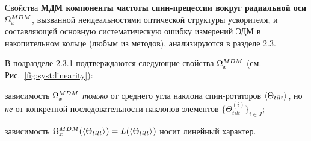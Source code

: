 Свойства \textbf{МДМ компоненты частоты спин-прецессии вокруг радиальной оси} $\Omega_x^{MDM}$, вызванной 
неидеальностями оптической структуры ускорителя, и составляющей основную 
систематическую ошибку измерений ЭДМ в накопительном кольце (любым из методов), анализируются в разделе 2.3.

В подразделе 2.3.1 подтверждаются следующие свойства $\Omega_x^{MDM}$ (см. Рис.~\ref{fig:syst:linearity}):
\begin{enumerate*}[(1)]
	\item зависимость $\Omega_x^{MDM}$ \emph{только} от среднего угла наклона спин-ротаторов $\avg{\Theta_{tilt}}$, 
	но \emph{не} от конкретной последовательности наклонов элементов $\{\Theta_{tilt}^{(i)}\}_{i\in J}$;
	\item зависимость $\W_x^{MDM}(\avg{\Theta_{tilt}}) = L(\avg{\Theta_{tilt}})$ носит линейный характер.
\end{enumerate*}


